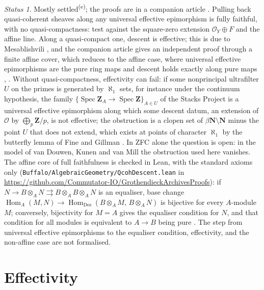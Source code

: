 \documentclass[11pt,a4paper]{amsart}
\theoremstyle{definition}
\theoremstyle{remark}
\newtheorem*{status}{Status}
\newcommand{\own}{\textsuperscript{(e)}}
\begin{document}
\begin{status}
Mostly settled\own; the proofs are in a companion article \cite{qcoh}. Pulling back quasi-coherent sheaves along any universal effective epimorphism is fully faithful, with no quasi-compactness: test against the square-zero extension $\mathcal O_Y\oplus F$ and the affine line. Along a quasi-compact one, descent is effective; this is due to Mesablishvili \cite{mesablishvili2004,mesablishvili-acs}, and the companion article gives an independent proof through a finite affine cover, which reduces to the affine case, where universal effective epimorphisms are the pure ring maps and descent holds exactly along pure maps \cite[0EUA, 08XA]{stacks}, \cite{mesablishvili}. Without quasi-compactness, effectivity can fail: if some nonprincipal ultrafilter $U$ on the primes is generated by $\aleph_1$ sets, for instance under the continuum hypothesis, the family $\{\operatorname{Spec}\mathbf Z_A\to\operatorname{Spec}\mathbf Z\}_{A\in U}$ of the Stacks Project \cite[0EUG]{stacks} is a universal effective epimorphism along which some descent datum, an extension of $\mathcal O$ by $\bigoplus_p\mathbf Z/p$, is not effective; the obstruction is a clopen set of $\beta\mathbf N\setminus\mathbf N$ minus the point $U$ that does not extend, which exists at points of character $\aleph_1$ by the butterfly lemma of Fine and Gillman \cite[Lemma~3.1]{pitz}. In ZFC alone the question is open: in the model of van Douwen, Kunen and van Mill the obstruction used here vanishes. The affine core of full faithfulness is checked in Lean, with the standard axioms only (\texttt{Buffalo/\allowbreak AlgebraicGeometry/\allowbreak QcohDescent.lean} in \url{https://github.com/Commutator-IO/GrothendieckArchivesProofs}): if $N\to B\otimes_AN\rightrightarrows B\otimes_AB\otimes_AN$ is an equaliser, base change $\operatorname{Hom}_A(M,N)\to\operatorname{Hom}_{\mathrm{Des}}(B\otimes_AM,\,B\otimes_AN)$ is bijective for every $A$-module $M$; conversely, bijectivity for $M=A$ gives the equaliser condition for $N$, and that condition for all modules is equivalent to $A\to B$ being pure \cite[08WE]{stacks}. The step from universal effective epimorphisms to the equaliser condition, effectivity, and the non-affine case are not formalised.
\end{status}

\section{Effectivity}\label{sec:eff}
\end{document}
